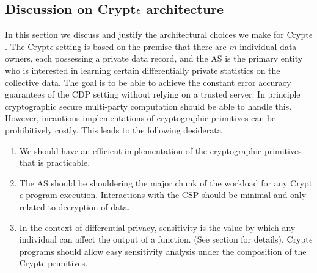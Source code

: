 \subsection{Discussion on Crypt$\epsilon$ architecture}
In this section we discuss and justify the architectural choices we make for Crypt$\epsilon$. The Crypt$\epsilon$ setting is based on the premise that there are $m$ individual data owners, each possessing a private data record, and the AS is the primary entity who is interested in learning certain differentially private statistics on the collective data. The goal is to be able to achieve the constant error accuracy guarantees of the CDP setting without relying on a trusted server. In principle cryptographic secure multi-party computation should be able to handle this. However, incautious implementations of cryptographic primitives can be prohibitively costly. This leads to the following desiderata
\begin{enumerate}\item We should have an efficient implementation of the cryptographic primitives that is practicable. \item The AS should be shouldering the major chunk of the workload for any Crypt$\epsilon$ program execution. Interactions with the CSP should be minimal and only related to decryption of data. \item In the context of differential privacy, sensitivity is the value by which any individual can affect the output of a function. (See section for details). Crypt$\epsilon$ programs should allow easy sensitivity analysis under the composition of the Crypt$\epsilon$ primitives. \end{enumerate}  
